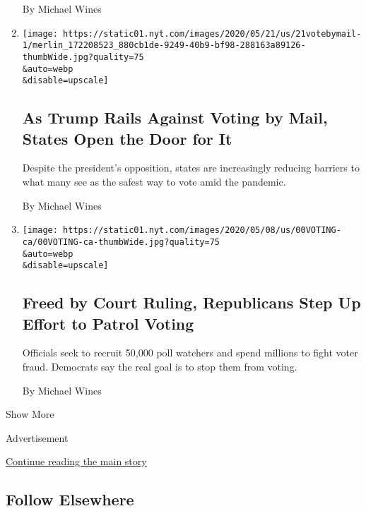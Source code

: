 \begin{enumerate}
  By Michael Wines
\item
  \href{/2020/05/21/us/vote-by-mail-trump.html}{}

  \texttt{[image: https://static01.nyt.com/images/2020/05/21/us/21votebymail-1/merlin\_172208523\_880cb1de-9249-40b9-bf98-288163a89126-thumbWide.jpg?quality=75\\\&auto=webp\\\&disable=upscale]}

  \hypertarget{as-trump-rails-against-voting-by-mail-states-open-the-door-for-it}{%
  \subsection{As Trump Rails Against Voting by Mail, States Open the
  Door for
  It}\label{as-trump-rails-against-voting-by-mail-states-open-the-door-for-it}}

  Despite the president's opposition, states are increasingly reducing
  barriers to what many see as the safest way to vote amid the pandemic.

  By Michael Wines
\item
  \href{/2020/05/18/us/Voting-republicans-trump.html}{}

  \texttt{[image: https://static01.nyt.com/images/2020/05/08/us/00VOTING-ca/00VOTING-ca-thumbWide.jpg?quality=75\\\&auto=webp\\\&disable=upscale]}

  \hypertarget{freed-by-court-ruling-republicans-step-up-effort-to-patrol-voting}{%
  \subsection{Freed by Court Ruling, Republicans Step Up Effort to
  Patrol
  Voting}\label{freed-by-court-ruling-republicans-step-up-effort-to-patrol-voting}}

  Officials seek to recruit 50,000 poll watchers and spend millions to
  fight voter fraud. Democrats say the real goal is to stop them from
  voting.

  By Michael Wines
\end{enumerate}

Show More

Advertisement

\protect\hyperlink{after-mid2}{Continue reading the main story}

\hypertarget{follow-elsewhere}{%
\subsection{Follow Elsewhere}\label{follow-elsewhere}}

